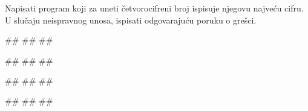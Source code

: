 \begin{Exercise}[label=KT_NG_12] 
Napisati program koji za uneti četvorocifreni broj ispisuje njegovu najveću cifru. 
U slučaju neispravnog unosa, ispisati odgovarajuću poruku o grešci.

\begin{miditest}
\begin{upotreba}{1}
#\naslovInt#
##
##
\end{upotreba}
\end{miditest}
\begin{miditest}
\begin{upotreba}{2}
#\naslovInt#
##
##
\end{upotreba}
\end{miditest}

\begin{miditest}
\begin{upotreba}{3}
#\naslovInt#
##
##
\end{upotreba}
\end{miditest}
\begin{miditest}
\begin{upotreba}{4}
#\naslovInt#
##
##
\end{upotreba}
\end{miditest}

\end{Exercise}
\ifresenja
 \begin{Answer}[ref=KT_NG_12]
\end{Answer}
\fi


